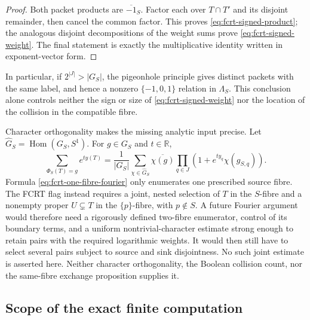 \begin{proof}
Both packet products are $\overline{-1}_S$.  Factor each over
$T\cap T'$ and its disjoint remainder, then cancel the common factor.  This
proves \eqref{eq:fcrt-signed-product}; the analogous disjoint decompositions
of the weight sums prove \eqref{eq:fcrt-signed-weight}.  The final statement
is exactly the multiplicative identity written in exponent-vector form.
\end{proof}

In particular, if $2^{|J|}>|G_S|$, the pigeonhole principle gives distinct
packets with the same label, and hence a nonzero
$\{-1,0,1\}$ relation in $\Lambda_S$.  This conclusion alone controls
neither the sign or size of \eqref{eq:fcrt-signed-weight} nor the location of
the collision in the compatible fibre.

Character orthogonality makes the missing analytic input precise.  Let
$\widehat G_S=\operatorname{Hom}(G_S,S^1)$.  For $g\in G_S$ and
$t\in\mathbb R$,
\[
 \sum_{\Phi_S(T)=g}e^{t y(T)}
 =\frac1{|G_S|}\sum_{\chi\in\widehat G_S}
   \overline{\chi(g)}
   \prod_{q\in J}\left(1+e^{t y_q}\chi(g_{S,q})\right).
\tag{FCRT-30}\label{eq:fcrt-one-fibre-fourier}
\]
Formula \eqref{eq:fcrt-one-fibre-fourier} only enumerates one prescribed
source fibre.  The FCRT flag instead requires a joint, nested selection of
$T$ in the $S$-fibre and a nonempty proper $U\subsetneq T$ in the
$\{p\}$-fibre, with $p\notin S$.  A future Fourier argument would therefore
need a rigorously defined two-fibre enumerator, control of its boundary
terms, and a uniform nontrivial-character estimate strong enough to retain
pairs with the required logarithmic weights.  It would then still have to
select several pairs subject to source and sink disjointness.  No such joint
estimate is asserted here.  Neither character orthogonality, the Boolean
collision count, nor the same-fibre exchange proposition supplies it.

\subsection{Scope of the exact finite computation}

